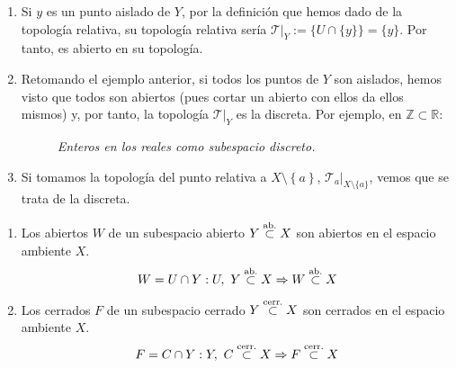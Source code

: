 \begin{ej}
\begin{enumerate}
    \item Si $y$ es un punto aislado de $Y$, por la definición que hemos dado de la topología relativa, su topología relativa sería $\mathcal{T}|_Y := \{ U \cap \{y\} \} = \{y\}$. Por tanto, es abierto en su topología.
    
    \item Retomando el ejemplo anterior, si todos los puntos de $Y$ son aislados, hemos visto que todos son abiertos (pues cortar un abierto con ellos da ellos mismos) y, por tanto, la topología $\mathcal{T}|_Y $ es la discreta. Por ejemplo, en $\mathbb{Z} \subset \mathbb{R}$:
\begin{figure}[H]
    \centering
    \caption{\textit{Enteros en los reales como subespacio discreto.}}
    \label{fig:enteros-en-los-reales-como-subespacio-discreto.}
\end{figure}

    \item Si tomamos la topología del punto relativa a $X \setminus \left\{ a \right\}$, $\mathcal{T}_a|_{X \setminus \{a\}}$, vemos que se trata de la discreta.
\end{enumerate}
\end{ej}

\begin{obs}
\begin{enumerate}
    \item Los abiertos $W$ de un subespacio abierto $Y \stackrel{\text{ab.}}{\subset} X$ son abiertos en el espacio ambiente $X$.
   	$$
    W = U \cap Y : U,\ Y\stackrel{\text{ab.}}{\subset} X \Rightarrow W \stackrel{\text{ab.}}{\subset} X 
    $$
    \item Los cerrados $F$ de un subespacio cerrado $Y \stackrel{\text{cerr.}}{\subset} X$ son cerrados en el espacio ambiente $X$.
    $$
    F = C \cap Y : Y,\ C\stackrel{\text{cerr.}}{\subset} X \Rightarrow F \stackrel{\text{cerr.}}{\subset} X
    $$
\end{enumerate}
\end{obs}

